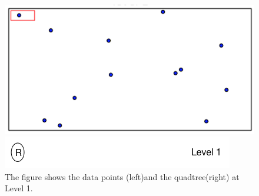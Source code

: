 \documentclass{article}
\begin{document}
\begin{figure}[H]
  \centering
  \begin{minipage}[b]{0.35\textwidth}
    \includegraphics[width=\textwidth]{1_1Quad1_1}  
  \end{minipage}
  \hfill
  \begin{minipage}[b]{0.5\textwidth}
    \includegraphics[width=\textwidth]{1_1Quad_1_tree}
  \end{minipage}
  \caption{The figure shows the data points (left)and the quadtree(right) at Level 1.}
\end{figure}

\vspace{2cm}
\end{document}
